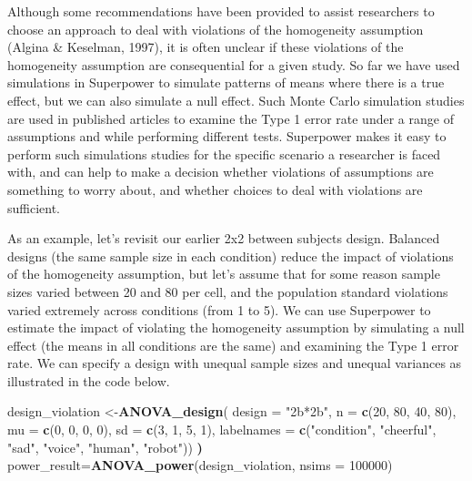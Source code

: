 \documentclass[
  ,jou,floatsintext]{apa6}
\newenvironment{Shaded}{\begin{snugshade}}{\end{snugshade}}
\newcommand{\DataTypeTok}[1]{\textcolor[rgb]{0.13,0.29,0.53}{#1}}
\newcommand{\DecValTok}[1]{\textcolor[rgb]{0.00,0.00,0.81}{#1}}
\newcommand{\ErrorTok}[1]{\textcolor[rgb]{0.64,0.00,0.00}{\textbf{#1}}}
\newcommand{\KeywordTok}[1]{\textcolor[rgb]{0.13,0.29,0.53}{\textbf{#1}}}
\newcommand{\NormalTok}[1]{#1}
\newcommand{\StringTok}[1]{\textcolor[rgb]{0.31,0.60,0.02}{#1}}
\begin{document}
Although some recommendations have been provided to assist researchers to choose an approach to deal with violations of the homogeneity assumption (Algina \& Keselman, 1997), it is often unclear if these violations of the homogeneity assumption are consequential for a given study.
So far we have used simulations in Superpower to simulate patterns of means where there is a true effect, but we can also simulate a null effect.
Such Monte Carlo simulation studies are used in published articles to examine the Type 1 error rate under a range of assumptions and while performing different tests.
Superpower makes it easy to perform such simulations studies for the specific scenario a researcher is faced with, and can help to make a decision whether violations of assumptions are something to worry about, and whether choices to deal with violations are sufficient.

As an example, let's revisit our earlier 2x2 between subjects design.
Balanced designs (the same sample size in each condition) reduce the impact of violations of the homogeneity assumption, but let's assume that for some reason sample sizes varied between 20 and 80 per cell, and the population standard violations varied extremely across conditions (from 1 to 5).
We can use Superpower to estimate the impact of violating the homogeneity assumption by simulating a null effect (the means in all conditions are the same) and examining the Type 1 error rate.
We can specify a design with unequal sample sizes and unequal variances as illustrated in the code below.

\begin{Shaded}
\begin{Highlighting}[]
\NormalTok{design_violation <-}\KeywordTok{ANOVA_design}\NormalTok{(}
 \DataTypeTok{design =} \StringTok{"2b*2b"}\NormalTok{, }\DataTypeTok{n =} \KeywordTok{c}\NormalTok{(}\DecValTok{20}\NormalTok{, }\DecValTok{80}\NormalTok{, }\DecValTok{40}\NormalTok{, }\DecValTok{80}\NormalTok{), }
 \DataTypeTok{mu =} \KeywordTok{c}\NormalTok{(}\DecValTok{0}\NormalTok{, }\DecValTok{0}\NormalTok{, }\DecValTok{0}\NormalTok{, }\DecValTok{0}\NormalTok{), }\DataTypeTok{sd =} \KeywordTok{c}\NormalTok{(}\DecValTok{3}\NormalTok{, }\DecValTok{1}\NormalTok{, }\DecValTok{5}\NormalTok{, }\DecValTok{1}\NormalTok{),}
 \DataTypeTok{labelnames =} \KeywordTok{c}\NormalTok{(}\StringTok{"condition"}\NormalTok{, }
                \StringTok{"cheerful"}\NormalTok{, }\StringTok{"sad"}\NormalTok{,}
                \StringTok{"voice"}\NormalTok{, }
                \StringTok{"human"}\NormalTok{, }\StringTok{"robot"}\NormalTok{))}
\ErrorTok{)}
\NormalTok{power_result=}\KeywordTok{ANOVA_power}\NormalTok{(design_violation,}
                         \DataTypeTok{nsims =} \DecValTok{100000}\NormalTok{)}
\end{Highlighting}
\end{Shaded}
\end{document}
